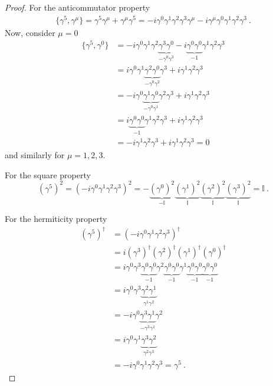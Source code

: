     \begin{proof}
        For the anticommutator property 
        \begin{equation*}
        \begin{aligned}
            \{\gamma^5, \gamma^\mu\} = \gamma^5 \gamma^\mu + \gamma^\mu \gamma^5 = - i \gamma^0 \gamma^1 \gamma^2 \gamma^3 \gamma^\mu - i \gamma^\mu \gamma^0 \gamma^1 \gamma^2 \gamma^3  ~.
        \end{aligned}
        \end{equation*}
        Now, consider $\mu=0$ 
        \begin{equation*}
        \begin{aligned}
            \{\gamma^5, \gamma^0\} & = - i \gamma^0 \gamma^1 \gamma^2 \underbrace{\gamma^3 \gamma^0}_{-\gamma^0 \gamma^3} - i \underbrace{\gamma^0 \gamma^0}_{-1} \gamma^1 \gamma^2 \gamma^3 \\ & = i \gamma^0 \gamma^1 \underbrace{\gamma^2 \gamma^0}_{- \gamma^0 \gamma^2} \gamma^3 + i \gamma^1 \gamma^2 \gamma^3 \\ & = - i \gamma^0 \underbrace{\gamma^1 \gamma^0}_{- \gamma^0 \gamma^1} \gamma^2 \gamma^3 + i \gamma^1 \gamma^2 \gamma^3 \\ & = i \underbrace{\gamma^0 \gamma^0 }_{-1} \gamma^1 \gamma^2 \gamma^3 + i \gamma^1 \gamma^2 \gamma^3 \\ & = - i \gamma^1 \gamma^2 \gamma^3 + i \gamma^1 \gamma^2 \gamma^3 = 0
        \end{aligned}
        \end{equation*}
        and similarly for $\mu = 1,2,3$.

        For the square property 
        \begin{equation*}
            (\gamma^5)^2 = (-i\gamma^0 \gamma^1 \gamma^2 \gamma^3)^2 = - \underbrace{(\gamma^0)^2}_{- \mathbb I} \underbrace{(\gamma^1)^2}_{\mathbb I} \underbrace{(\gamma^2)^2}_{\mathbb I} \underbrace{(\gamma^3)^2}_{\mathbb I} = \mathbb I ~.
        \end{equation*}

        For the hermiticity property 
        \begin{equation*}
        \begin{aligned}
            (\gamma^5)^\dagger & = (-i \gamma^0 \gamma^1 \gamma^2 \gamma^3)^\dagger \\ & = i (\gamma^3)^\dagger (\gamma^2)^\dagger (\gamma^1)^\dagger (\gamma^0)^\dagger \\ & = i \gamma^0 \gamma^3 \underbrace{\gamma^0 \gamma^0}_{-1}\gamma^2 \underbrace{\gamma^0 \gamma^0}_{-1} \gamma^1 \underbrace{\gamma^0 \gamma^0}_{-1} \underbrace{\gamma^0 \gamma^0}_{-1} \\ & = i \gamma^0 \gamma^3 \underbrace{\gamma^2 \gamma^1}_{\gamma^1 \gamma^2} \\ & = - i \gamma^0 \underbrace{\gamma^3 \gamma^1}_{-\gamma^3 \gamma^1} \gamma^2 \\ & = i \gamma^0 \gamma^1 \underbrace{\gamma^3 \gamma^2}_{\gamma^2 \gamma^3} \\ & = - i \gamma^0 \gamma^1 \gamma^2 \gamma^3 = \gamma^5 ~.
        \end{aligned}
        \end{equation*}


\end{proof}
